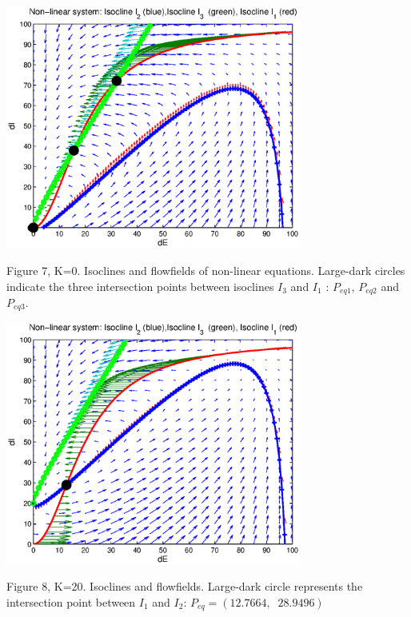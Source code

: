 \documentclass{article}
\begin{document}
\begin{center}
 \includegraphics[width=\textwidth, height=8cm]{linear3.eps}
\begin{footnotesize}Figure 7, K=0. Isoclines and flowfields of non-linear equations. Large-dark circles indicate the three intersection points between isoclines $I_3$ and $I_1$ : $P_{eq1}$, $P_{eq2}$ and $P_{eq3}$. \end{footnotesize}
\end{center}
\begin{center}
 \includegraphics[width=\textwidth, height=8cm]{linear4.eps}
\begin{footnotesize}Figure 8, K=20. Isoclines and flowfields. Large-dark circle represents the intersection point between $I_1$ and $I_2$: $P_{eq}=(12.7664,\;\;28.9496)$ \end{footnotesize}
\end{center}
\end{document}
